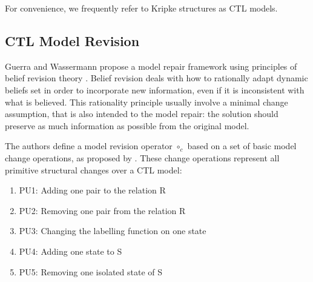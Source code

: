 \documentclass{llncs}
\begin{document}
For convenience, we frequently refer to Kripke structures as CTL models. %


\subsection{CTL Model Revision}\label{secCTLModRev}

Guerra and Wassermann \cite{GW10,Pau10} propose a model repair framework using principles of belief revision theory \cite{AGM85}. Belief revision deals with how to rationally adapt dynamic beliefs set in order to incorporate new information, even if it is inconsistent with what is believed. This rationality principle usually involve a minimal change assumption, that is also intended to the model repair: the solution should preserve as much information as possible from the original model. 

%
The authors define a model revision operator $ \circ_c $ based on a set of basic model change operations, as proposed by \cite{ZD08}. These change operations represent all primitive structural changes over a CTL model:

\begin{enumerate} 
\item[] {PU1:} Adding one pair to the relation R
\item[] {PU2:} Removing one pair from the relation R
\item[] {PU3:} Changing the labelling function on one state
\item[] {PU4:} Adding one state to S
\item[] {PU5:} Removing one isolated state of S
\end{enumerate}
\end{document}
